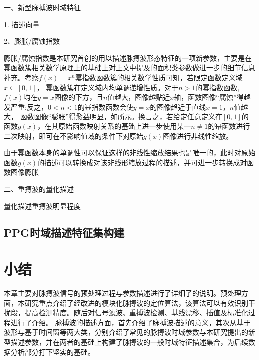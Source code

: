 一、新型脉搏波时域特征

1. 描述向量

2、膨胀/腐蚀指数

膨胀/腐蚀指数是本研究首创的用以描述脉搏波形态特征的一项新参数，主要是在幂函数簇相关数学原理上的基础上对上文中提及的面积类参数做进一步的细节信息补充。考察$f(x)=x^n$幂指数函数簇的相关数学性质可知，若限定函数定义域$x\subseteq [0,1]$，
幂函数簇在定义域内均单调递增性质。对于$n>1$的幂指数函数,$f(x)$均在$y=x$图像的下方，且$n$值越大，图像越贴近$x$轴，函数图像“腐蚀”得越发严重;反之，$0<n<1$的幂指数函数会使$y=x$的图像趋近于直线$x=1$，$n$值越大，
函数图像“膨胀”得愈益明显，如所示。换言之，若给定任意定义在$[0,1]$的函数$g(x)$，在其原始函数映射关系的基础上进一步使用某一$n\neq 1$的幂函数进行二次映射，即可在不影响值域的条件下对原始$g(x)$图像进行非线性缩放。

由于幂函数本身的单调性可以保证这样的非线性缩放结果也是唯一的，此时对原始函数$g(x)$的描述可以转换成对该非线形缩放过程的描述，并可进一步转换成对函数图像膨胀




二、重搏波的量化描述

量化描述重搏波明显程度

\subsection{PPG时域描述特征集构建}
\section{小结}
本章主要对脉搏波信号的预处理过程与参数描述进行了详细了的说明。预处理方面，本研究重点介绍了经改进的模块化脉搏波的定位算法，该算法可以有效识别干扰段，提高检测精度。随后对信号滤波、重搏波检测、基线漂移、插值及标准化过程进行了介绍。
脉搏波的描述方面，首先介绍了脉搏波描述的意义，其次从基于波形与基于时间窗等两大类，分别介绍了常见的脉搏波时域参数与本研究提出的新型描述参数，并在两者的基础上构建了脉搏波的一般时域特征描述集合，为后续数据分析部分打下坚实的基础。